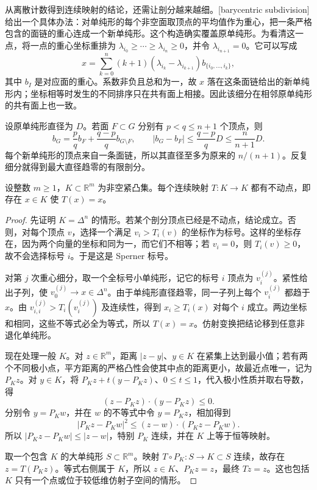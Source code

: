 从离散计数得到连续映射的结论，还需让剖分越来越细。[barycentric subdivision]给出一个具体办法：对单纯形的每个非空面取顶点的平均值作为重心，把一条严格包含的面链的重心连成一个新单纯形。这个构造确实覆盖原单纯形。为看清这一点，将一点的重心坐标重排为 \(\lambda_{i_0}\ge\cdots\ge\lambda_{i_n}\ge0\)，并令 \(\lambda_{i_{n+1}}=0\)。它可以写成
\[
 x=\sum_{k=0}^n(k+1)(\lambda_{i_k}-\lambda_{i_{k+1}})
 b_{\{i_0,\ldots,i_k\}},
\]
其中 \(b_I\) 是对应面的重心。系数非负且总和为一，故 \(x\) 落在这条面链给出的新单纯形内；坐标相等时发生的不同排序只在共有面上相接。因此该细分在相邻原单纯形的共有面上也一致。

\ProseParagraphBreak
设原单纯形直径为 \(D\)。若面 \(F\subset G\) 分别有 \(p<q\le n+1\) 个顶点，则
\[
 b_G=\frac pq b_F+\frac{q-p}{q}b_{G\setminus F},\qquad
 |b_G-b_F|\le\frac{q-p}{q}D\le\frac n{n+1}D.
\]
每个新单纯形的顶点来自一条面链，所以其直径至多为原来的 \(n/(n+1)\)。反复细分就得到最大直径趋零的有限剖分。

\begin{theorem}[Brouwer]
\label{b2:thm:H3-brouwer}
设整数 \(m\ge1\)，\(K\subset\mathbb R^m\) 为非空紧凸集。每个连续映射 \(T:K\to K\) 都有不动点，即存在 \(x\in K\) 使 \(T(x)=x\)。
\end{theorem}
\begin{proof}
先证明 \(K=\Delta^n\) 的情形。若某个剖分顶点已经是不动点，结论成立。否则，对每个顶点 \(v\)，选择一个满足 \(v_i>T_i(v)\) 的坐标作为标号。这样的坐标存在，因为两个向量的坐标和同为一，而它们不相等；若 \(v_i=0\)，则 \(T_i(v)\ge0\)，故不会选择标号 \(i\)。于是这是 Sperner 标号。

对第 \(j\) 次重心细分，取一个全标号小单纯形，记它的标号 \(i\) 顶点为 \(v_i^{(j)}\)。紧性给出子列，使 \(v_0^{(j)}\to x\in\Delta^n\)。由于单纯形直径趋零，同一子列上每个 \(v_i^{(j)}\) 都趋于 \(x\)。由 \(v_{i,i}^{(j)}>T_i(v_i^{(j)})\) 及连续性，得到 \(x_i\ge T_i(x)\) 对每个 \(i\) 成立。两边坐标和相同，这些不等式必全为等式，所以 \(T(x)=x\)。仿射变换把结论移到任意非退化单纯形。

现在处理一般 \(K\)。对 \(z\in\mathbb R^m\)，距离 \(|z-y|\)、\(y\in K\) 在紧集上达到最小值；若有两个不同极小点，平方距离的严格凸性会使其中点的距离更小，故最近点唯一，记为 \(P_Kz\)。对 \(y\in K\)，将 \(P_Kz+t(y-P_Kz)\)、\(0\le t\le1\)，代入极小性质并取右导数，得
\[
 (z-P_Kz)\cdot(y-P_Kz)\le0.
\]
分别令 \(y=P_Kw\)，并在 \(w\) 的不等式中令 \(y=P_Kz\)，相加得到
\[
 |P_Kz-P_Kw|^2\le(z-w)\cdot(P_Kz-P_Kw).
\]
所以 \(|P_Kz-P_Kw|\le|z-w|\)，特别 \(P_K\) 连续，并在 \(K\) 上等于恒等映射。

取一个包含 \(K\) 的大单纯形 \(S\subset\mathbb R^m\)。映射 \(T\circ P_K:S\to K\subset S\) 连续，故存在 \(z=T(P_Kz)\)。等式右侧属于 \(K\)，所以 \(z\in K\)、\(P_Kz=z\)，最终 \(Tz=z\)。这也包括 \(K\) 只有一个点或位于较低维仿射子空间的情形。
\end{proof}

